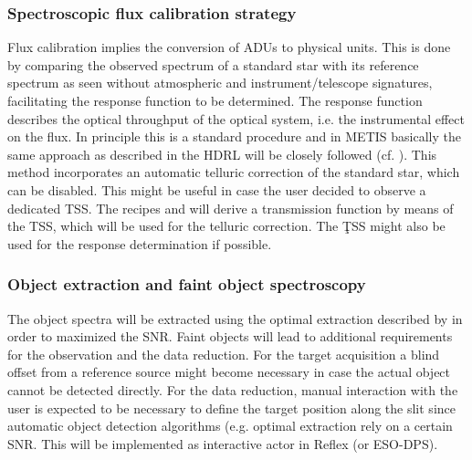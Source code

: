 \subsubsection{Spectroscopic flux calibration strategy}\label{ssec:fluxcal}
Flux calibration implies the conversion of ADUs to physical units. This is done by comparing the observed spectrum of a standard star with its reference spectrum as seen without atmospheric and instrument/telescope signatures, facilitating the response function to be determined. The response function describes the optical throughput of the optical system, i.e. the instrumental effect on the flux. In principle this is a standard procedure and in \ac{METIS} basically the same approach as described in the \ac{HDRL} will be closely followed (cf. \cite{hdrl}). This method incorporates an automatic telluric correction of the standard star, which can be disabled. This might be useful in case the user decided to observe a dedicated \ac{TSS}. The recipes  and  will derive a transmission function by means of the \ac{TSS}, which will be used for the telluric correction. The \c{TSS} might also be used for the response determination if possible.





\subsubsection{Object extraction and faint object spectroscopy}\label{sec:fospectro}
The object spectra will be extracted using the optimal extraction described by \cite{pis21} in order to maximized the \ac{SNR}. 
Faint objects will lead to additional requirements for the observation and the data reduction. For the target acquisition a blind offset from a reference source might become necessary in case the actual object cannot be detected directly. For the data reduction, manual interaction with the user is expected to be necessary to define the target position along the slit since automatic object detection algorithms (e.g. optimal extraction %
rely on a certain \ac{SNR}. This will be implemented as interactive actor in Reflex (or ESO-DPS).